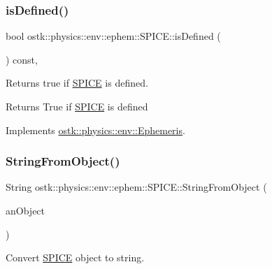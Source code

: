 \subsubsection{\texorpdfstring{is\+Defined()}{isDefined()}}
{\footnotesize\ttfamily bool ostk\+::physics\+::env\+::ephem\+::\+S\+P\+I\+C\+E\+::is\+Defined (\begin{DoxyParamCaption}{ }\end{DoxyParamCaption}) const\hspace{0.3cm}{\ttfamily [override]}, {\ttfamily [virtual]}}



Returns true if \hyperlink{classostk_1_1physics_1_1env_1_1ephem_1_1_s_p_i_c_e}{S\+P\+I\+CE} is defined. 

\begin{DoxyReturn}{Returns}
True if \hyperlink{classostk_1_1physics_1_1env_1_1ephem_1_1_s_p_i_c_e}{S\+P\+I\+CE} is defined 
\end{DoxyReturn}


Implements \hyperlink{classostk_1_1physics_1_1env_1_1_ephemeris_ace5a637a5f25f700dfe1a2cef2b08162}{ostk\+::physics\+::env\+::\+Ephemeris}.

\mbox{\label{classostk_1_1physics_1_1env_1_1ephem_1_1_s_p_i_c_e_a97570f88c117786553614fc42d1ac5ff}} 
\subsubsection{\texorpdfstring{String\+From\+Object()}{StringFromObject()}}
{\footnotesize\ttfamily String ostk\+::physics\+::env\+::ephem\+::\+S\+P\+I\+C\+E\+::\+String\+From\+Object (\begin{DoxyParamCaption}\item[{const \hyperlink{classostk_1_1physics_1_1env_1_1ephem_1_1_s_p_i_c_e_ae84db78d858cdd0a1dc3ff53090f4a1f}{S\+P\+I\+C\+E\+::\+Object} \&}]{an\+Object }\end{DoxyParamCaption})\hspace{0.3cm}{\ttfamily [static]}}



Convert \hyperlink{classostk_1_1physics_1_1env_1_1ephem_1_1_s_p_i_c_e}{S\+P\+I\+CE} object to string. 


